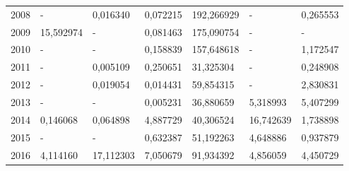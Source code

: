 \begin{table}
\begin{tabular}{p{1cm}p{2cm}p{2cm}p{2cm}p{2cm}p{2cm}p{2cm}}
 2008 &                                    - &                                0,016340 &                           0,072215 &                     192,266929 &                               - &                     0,265553 \\
 2009 &                            15,592974 &                                       - &                           0,081463 &                     175,090754 &                               - &                            - \\
 2010 &                                    - &                                       - &                           0,158839 &                     157,648618 &                               - &                     1,172547 \\
 2011 &                                    - &                                0,005109 &                           0,250651 &                      31,325304 &                               - &                     0,248908 \\
 2012 &                                    - &                                0,019054 &                           0,014431 &                      59,854315 &                               - &                     2,830831 \\
 2013 &                                    - &                                       - &                           0,005231 &                      36,880659 &                        5,318993 &                     5,407299 \\
 2014 &                             0,146068 &                                0,064898 &                           4,887729 &                      40,306524 &                       16,742639 &                     1,738898 \\
 2015 &                                    - &                                       - &                           0,632387 &                      51,192263 &                        4,648886 &                     0,937879 \\
 2016 &                             4,114160 &                               17,112303 &                           7,050679 &                      91,934392 &                        4,856059 &                     4,450729 \\
\bottomrule
\end{tabular}
\end{table}
